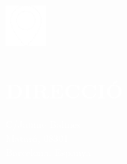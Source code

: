 \documentclass[../main.tex]{subfiles}
\begin{document}
    \hspace*{0.2cm}
    \begin{minipage}[t]{2cm}
        \vspace*{0.75cm}\includegraphics[width=1.5cm]{assets/location.png}
    \end{minipage}
    \begin{minipage}[t]{5cm}

        \vspace*{0.5cm}
        \section*{\textcolor{white}{DIRECCIÓ}}
        \vspace*{-0.25cm}
        \textcolor{white}{
            C/Jaume Balmes\\
            Mataró, 08301 \\
            Barcelona, Espanya
        }
    \end{minipage}
\end{document}

